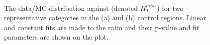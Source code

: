 \begin{figure}[h!]
  \centering
  ~~
  \\
  \caption{ 
  The data/MC distribution against \mht (denoted $H_T^{miss}$) for two
  representative categories in the \gj (a) and \mjj (b) control regions.
  Linear and constant fits are made to the ratio and their p-value and
  fit parameters are shown on the plot.
  }
  \label{fig:linearFitExamples}
\end{figure}

